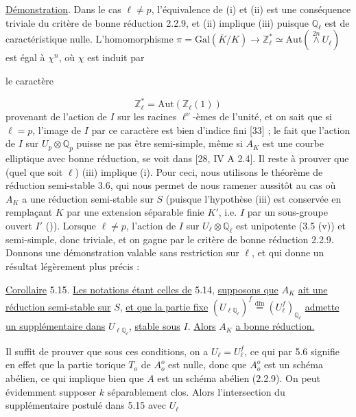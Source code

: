 \underline{Démonstration}. Dans le cas $\ell \neq p$, l'équivalence de (i) et (ii) est une conséquence triviale du critère de bonne réduction 2.2.9, et (ii) implique (iii) puisque $\mathbb{Q}_\ell$ est de caractéristique nulle. L'homomorphisme $\pi = \mathrm{Gal}(\overline{K}/K) \longrightarrow \mathbb{Z}^*_\ell \simeq \mathrm{Aut}(\stackrel{2n}{\wedge} U_\ell)$ est égal à $\chi^n$, où $\chi$ est induit par



le caractère

\begin{equation*}
\mathbb{Z}_\ell^{*} = \mathrm{Aut}(\mathbb{Z}_\ell(1))
\end{equation*}
provenant de l'action de $I$ sur les racines $\ell^\nu$-èmes de l'unité, et on sait que si $\ell = p$, l'image de $I$ par ce caractère est bien d'indice fini [33] ; le fait que l'action de $I$ sur $U_p \otimes \mathbb{Q}_p$ puisse ne pas être semi-simple, même si $A_K$ est une courbe elliptique avec bonne réduction, se voit dans [28, IV A 2.4]. Il reste à prouver que (quel que soit $\ell$) (iii) implique (i). Pour ceci, nous utilisons le théorème de réduction semi-stable 3.6, qui nous permet de nous ramener aussitôt au cas où $A_K$ a une réduction semi-stable sur $S$ (puisque l'hypothèse (iii) est conservée en remplaçant $K$ par une extension séparable finie $K'$, i.e. $I$ par un sous-groupe ouvert $I'$ (\quad\quad )). Lorsque $\ell \neq p$, l'action de $I$ sur $U_\ell \otimes \mathbb{Q}_\ell$ est unipotente (3.5 (v)) et semi-simple, donc triviale, et on gagne par le critère de bonne réduction 2.2.9. Donnons une démonstration valable sans restriction sur $\ell$, et qui donne un résultat légèrement plus précis :

\underline{Corollaire} 5.15. \underline{Les notations étant celles de} 5.14, \underline{supposons que} $A_K$ \underline{ait une réduction semi-stable sur} $S$, \underline{et que la partie fixe} $(U_{\ell\mathbb{Q}_\ell})^f \stackrel{\mathrm{dfn}}{=} (U_\ell^f)_{\mathbb{Q}_\ell}$ \underline{admette un supplémentaire dans} $U_{\ell\mathbb{Q}_\ell}$, \underline{stable sous} $I$. \underline{Alors} $A_K$ \underline{a bonne réduction.}

Il suffit de prouver que sous ces conditions, on a $U_\ell = U_\ell^f$, ce qui par 5.6 signifie en effet que la partie torique $T_o$ de $A_o^o$ est nulle, donc que $A_o^o$ est un schéma abélien, ce qui implique bien que $A$ est un schéma abélien (2.2.9). On peut évidemment supposer $k$ séparablement clos. Alors l'intersection du supplémentaire postulé dans 5.15 avec $U_\ell$


